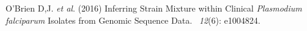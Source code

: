 \documentclass{article}
\newcounter{todocounter}
\newcommand{\done}[2][]
{\todo[color=green!40, #1]{#2}}
\newcommand{\donenum}[2][]
{\stepcounter{todocounter}\done[#1]{\thetodocounter: #2}}
\begin{document}
\begin{thebibliography}{}






O'Brien D,J. {\em et al}. (2016)
\newblock Inferring Strain Mixture within Clinical {\em Plasmodium falciparum} Isolates from Genomic Sequence Data.
~{\em 12\/}(6): e1004824.


\end{thebibliography}
\end{document}
